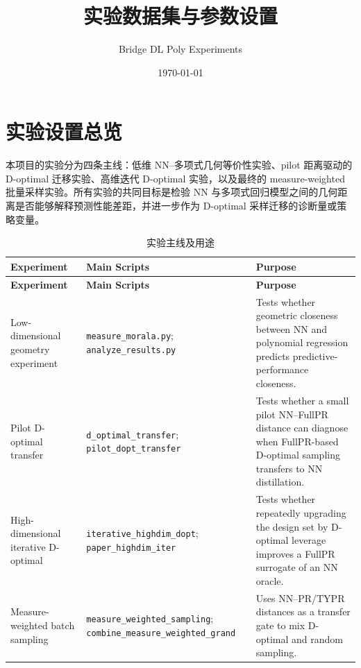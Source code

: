 \documentclass[UTF8,a4paper,11pt]{ctexart}
\title{实验数据集与参数设置}
\author{Bridge DL Poly Experiments}
\date{\today}
\begin{document}
\maketitle

\section{实验设置总览}

本项目的实验分为四条主线：低维 NN--多项式几何等价性实验、pilot 距离驱动的 D-optimal 迁移实验、高维迭代 D-optimal 实验，以及最终的 measure-weighted 批量采样实验。所有实验的共同目标是检验 NN 与多项式回归模型之间的几何距离是否能够解释预测性能差距，并进一步作为 D-optimal 采样迁移的诊断量或策略变量。

\begin{longtable}{L{0.22\textwidth}L{0.30\textwidth}L{0.38\textwidth}}
\caption{实验主线及用途}
\label{tab:experiment-lines} \\
\toprule
\textbf{Experiment} & \textbf{Main Scripts} & \textbf{Purpose} \\
\midrule
\endfirsthead
\toprule
\textbf{Experiment} & \textbf{Main Scripts} & \textbf{Purpose} \\
\midrule
\endhead
\bottomrule
\endlastfoot

Low-dimensional geometry experiment
& \texttt{measure\_morala.py}; \texttt{analyze\_results.py}
& Tests whether geometric closeness between NN and polynomial regression predicts predictive-performance closeness. \\

Pilot D-optimal transfer
& \texttt{d\_optimal\_transfer}; \texttt{pilot\_dopt\_transfer}
& Tests whether a small pilot NN--FullPR distance can diagnose when FullPR-based D-optimal sampling transfers to NN distillation. \\

High-dimensional iterative D-optimal
& \texttt{iterative\_highdim\_dopt}; \texttt{paper\_highdim\_iter}
& Tests whether repeatedly upgrading the design set by D-optimal leverage improves a FullPR surrogate of an NN oracle. \\

Measure-weighted batch sampling
& \texttt{measure\_weighted\_sampling}; \texttt{combine\_measure\_weighted\_grand}
& Uses NN--PR/TYPR distances as a transfer gate to mix D-optimal and random sampling. \\

\end{longtable}
\end{document}
